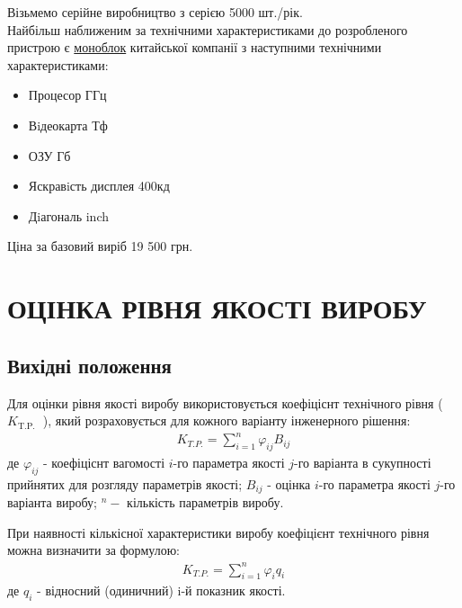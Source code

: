 \documentclass[a4paper,14pt]{extreport}
\begin{document}
    Візьмемо серійне виробництво з серією 5000 шт./рік.\\ 

    Найбільш наближеним за технічними характеристиками до розробленого
    пристрою  є  \href{https://www.itbox.ua/ua/product/Kompyuter_HP_24-df0054ua_IPS_Pentium_J5040_426F3EA-p702646/?utm=shopping&utm_content=shopping&gclid=CjwKCAiAtdGNBhAmEiwAWxGcUoFSjhq16_yyk_vusMuu-Nb1aAfwNXYS7bWDjVH86uK1hBbyGcG11BoCPasQAvD_BwE}{моноблок}  китайської  компанії  з  наступними  технічними
    характеристиками:
    \begin{itemize}
    \item Процесор  ГГц 
    \item Вiдеокарта  Тф
    \item ОЗУ  Гб
    \item Яскравiсть дисплея \dotfill 400кд
    \item Дiагональ  inch
    \end{itemize}
    Ціна за базовий виріб 19 500 грн.



\chapter{ОЦІНКА РІВНЯ ЯКОСТІ ВИРОБУ}

\section{Вихідні положення}
    Для оцінки рівня якості виробу використовується коефіціснт технічного рівня ( $K_{\text {T.P. }}$ ), який розраховується для кожного варіанту інженерного рішення:
    \begin{align}
    K_{T . P .}=\sum_{i=1}^{n} \varphi_{i j} B_{i j}
    \end{align}
    де $\varphi_{i j}$ - коефіціснт вагомості $i$-го параметра якості $j$-го варіанта в сукупності прийнятих для розгляду параметрів якості; $B_{i j}$ - оцінка $i$-го параметра якості $j$-го варіанта виробу; $^{n}-$ кількість параметрів виробу.

    При наявності кількісної характеристики виробу коефіцієнт технічного рівня можна визначити за формулою:
    \begin{align}
    K_{T. P.}=\sum_{i=1}^{n} \varphi_{i} q_{i}
    \end{align}
    де $q_{i}$ - відносний (одиничний)   i-й показник якості. 
\end{document}
